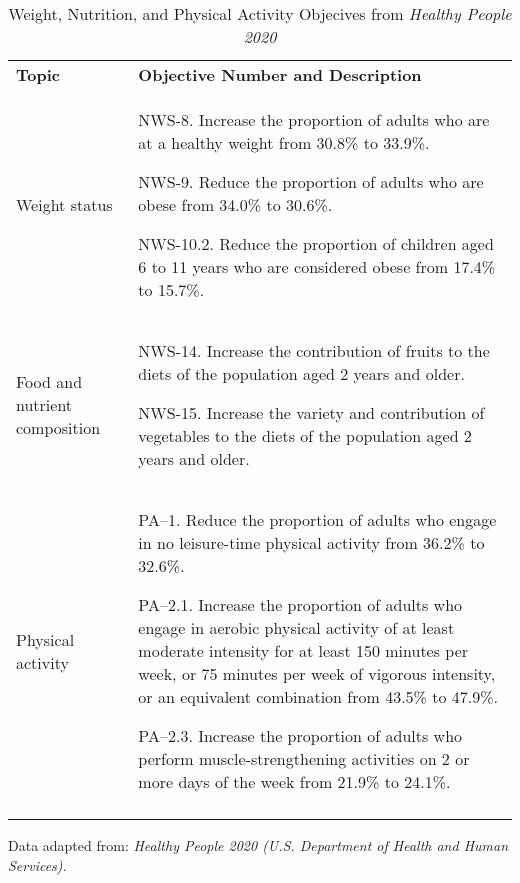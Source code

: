 \documentclass[title={Chapter 1}]{fdsn201notes}
\begin{document}
\begin{table}[H]
    \centering
    \begin{threeparttable}
		\caption{Weight, Nutrition, and Physical Activity Objecives from \emph{Healthy People 2020}}
		\label{tab:healthy-people-2020}
		\begin{tabular}{p{} p{}}
			\rowcolor{rowdarkgreen}\textbf{Topic} & \textbf{Objective Number and Description}\\
			Weight status & NWS-8. Increase the proportion of adults who are at a healthy weight from 30.8\% to 33.9\%.

			NWS-9. Reduce the proportion of adults who are obese from 34.0\% to 30.6\%.

			NWS-10.2. Reduce the proportion of children aged 6 to 11 years who are considered obese from 17.4\% to 15.7\%.\\
			Food and nutrient composition & NWS-14. Increase the contribution of fruits to the diets of the population aged 2 years and older.

			NWS-15. Increase the variety and contribution of vegetables to the diets of the population aged 2 years and older.\\
			Physical activity & PA--1. Reduce the proportion of adults who engage in no leisure-time physical activity from 36.2\% to 32.6\%.

			PA--2.1. Increase the proportion of adults who engage in aerobic physical activity of at least moderate intensity for at least 150 minutes per week, or 75 minutes per week of vigorous intensity, or an equivalent combination from 43.5\% to 47.9\%.

			PA--2.3. Increase the proportion of adults who perform muscle-strengthening activities on 2 or more days of the week from 21.9\% to 24.1\%.\\
			\rowcolor{rowdarkgreen} & \\
		\end{tabular}
		\begin{tablenotes}
			\small
			\item Data adapted from: \emph{Healthy People 2020 (U.S. Department of Health and Human Services).}
		\end{tablenotes}
	\end{threeparttable}
\end{table}
\end{document}
